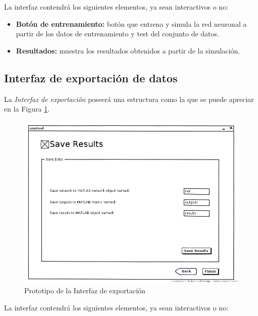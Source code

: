 			La interfaz contendrá los siguientes elementos, ya sean interactivos o no:
			
			\begin{itemize}
				\item \textbf{Botón de entrenamiento:} botón que entrena y simula la red neuronal a partir de los datos de entrenamiento y test del conjunto de datos.
				\item \textbf{Resultados:} muestra los resultados obtenidos a partir de la simulación.
			\end{itemize}
		
		\subsection{Interfaz de exportación de datos}
		
			La \textit{Interfaz de exportación} poseerá una estructura como la que se puede apreciar en la Figura \ref{fig:int4}.\\
			
			\begin{figure}[htbp]
				\centering
				\includegraphics[scale=0.5]{interfaz/Interfaz_export.png}
				\caption{Prototipo de la Interfaz de exportación}
				\label{fig:int4}
			\end{figure}
			
			La interfaz contendrá los siguientes elementos, ya sean interactivos o no:
			
